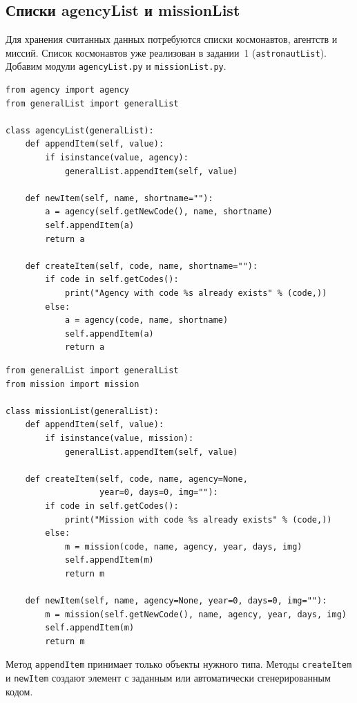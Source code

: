 \documentclass[a4paper,14pt]{extarticle}
\begin{document}
\subsection{Списки agencyList и missionList}

Для хранения считанных данных потребуются списки космонавтов, агентств и миссий. Список космонавтов уже реализован в задании~1 (\texttt{astronautList}). Добавим модули \texttt{agencyList.py} и \texttt{missionList.py}.

\begin{lstlisting}[caption={Модуль \texttt{agencyList.py}}]
from agency import agency
from generalList import generalList

class agencyList(generalList):
    def appendItem(self, value):
        if isinstance(value, agency):
            generalList.appendItem(self, value)

    def newItem(self, name, shortname=""):
        a = agency(self.getNewCode(), name, shortname)
        self.appendItem(a)
        return a

    def createItem(self, code, name, shortname=""):
        if code in self.getCodes():
            print("Agency with code %s already exists" % (code,))
        else:
            a = agency(code, name, shortname)
            self.appendItem(a)
            return a
\end{lstlisting}

\begin{lstlisting}[caption={Модуль \texttt{missionList.py}}]
from generalList import generalList
from mission import mission

class missionList(generalList):
    def appendItem(self, value):
        if isinstance(value, mission):
            generalList.appendItem(self, value)

    def createItem(self, code, name, agency=None,
                   year=0, days=0, img=""):
        if code in self.getCodes():
            print("Mission with code %s already exists" % (code,))
        else:
            m = mission(code, name, agency, year, days, img)
            self.appendItem(m)
            return m

    def newItem(self, name, agency=None, year=0, days=0, img=""):
        m = mission(self.getNewCode(), name, agency, year, days, img)
        self.appendItem(m)
        return m
\end{lstlisting}

Метод \texttt{appendItem} принимает только объекты нужного типа. Методы \texttt{createItem} и \texttt{newItem} создают элемент с заданным или автоматически сгенерированным кодом.
\end{document}
